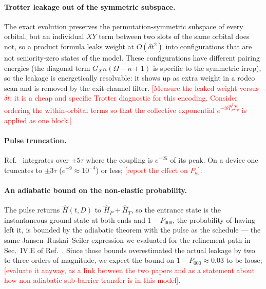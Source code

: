 \documentclass[
  aps,
  prc,
  reprint,
  superscriptaddress,
  floatfix,
  nofootinbib
]{revtex4-2}
\newcommand{\todo}[1]{\textcolor{red}{[#1]}}
\newcommand{\HP}{\hat H_{P}}
\newcommand{\HT}{\hat H_{T}}
\begin{document}
\paragraph{Trotter leakage out of the symmetric subspace.}
The exact evolution preserves the permutation-symmetric subspace of every
orbital, but an individual $XY$ term between two slots of the same orbital
does not, so a product formula leaks weight at $O(\delta t^2)$ into
configurations that are not seniority-zero states of the model.  These
configurations have different pairing energies (the diagonal term
$G_Xn(\Omega-n+1)$ is specific to the symmetric irrep), so the leakage is
energetically resolvable: it shows up as extra weight in a rodeo scan and
is removed by the exit-channel filter.  \todo{Measure the leaked weight
versus $\delta t$; it is a cheap and specific Trotter diagnostic for
this encoding.  Consider ordering the within-orbital terms so that the
collective exponential $e^{-i\theta\hat P^\dagger_p\hat P_p}$ is applied as
one block.}

\paragraph{Pulse truncation.}
Ref.~\cite{TwoFragment2026} integrates over $\pm5\tau$ where the coupling
is $e^{-25}$ of its peak.  On a device one truncates to $\pm3\tau$
($e^{-9}\approx10^{-4}$) or less; \todo{report the effect on $P_\kappa$}.

\paragraph{An adiabatic bound on the non-elastic probability.}
The pulse returns $\hat H(t,D)$ to $\HP+\HT$, so the entrance state is the
instantaneous ground state at both ends and $1-P_{000}$, the probability of
having left it, is bounded by the adiabatic theorem with the pulse as the
schedule --- the same Jansen--Ruskai--Seiler expression we evaluated for
the refinement path in Sec.~IV.E of Ref.~\cite{EigenQPairing2026}.  Since
those bounds overestimated the actual leakage by two to three orders of
magnitude, we expect the bound on $1-P_{000}\approx0.03$ to be loose;
\todo{evaluate it anyway, as a link between the two papers and as a
statement about how non-adiabatic sub-barrier transfer is in this model}.

\end{document}
